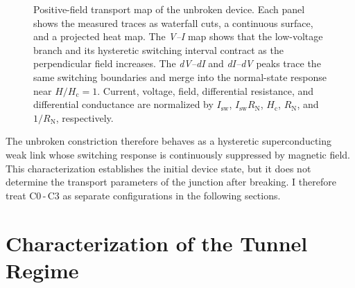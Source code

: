         \begin{figure}[t]
            \centering
            \hfill%
            \hfill%
            \caption{
                Positive-field transport map of the unbroken device. Each panel shows the measured traces as waterfall cuts, a continuous surface, and a projected heat map. The \textit{V--I} map shows that the low-voltage branch and its hysteretic switching interval contract as the perpendicular field increases. The \textit{dV--dI} and \textit{dI--dV} peaks trace the same switching boundaries and merge into the normal-state response near $H/H_\mathrm{c}=1$. Current, voltage, field, differential resistance, and differential conductance are normalized by $I_\mathrm{sw}$, $I_\mathrm{sw}R_\mathrm{N}$, $H_\mathrm{c}$, $R_\mathrm{N}$, and $1/R_\mathrm{N}$, respectively.
                }
            \label{fig:ac:magnetic-fields:unbroken:map}
        \end{figure}

        The unbroken constriction therefore behaves as a hysteretic superconducting weak link whose switching response is continuously suppressed by magnetic field. This characterization establishes the initial device state, but it does not determine the transport parameters of the junction after breaking. I therefore treat C0\,-\,C3 as separate configurations in the following sections.

    \clearpage
    \section{Characterization of the Tunnel Regime}
    \label{appendix:ac:tunneling}


